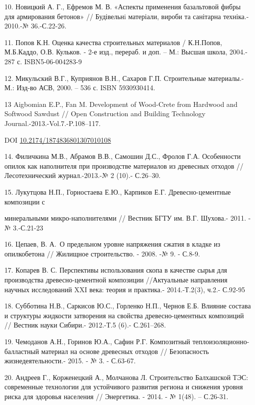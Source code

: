 10. Новицкий А. Г., Ефремов М. В. «Аспекты применения базальтовой фибры
для армирования бетонов» // Будівельнi матеріали, вироби та санітарна
техніка.- 2010.-№ 36.-С.22-26.
\href{http://www.irbis-nbuv.gov.ua/cgi-bin/irbis_nbuv/cgiirbis_64.exe?I21DBN=LINK&P21DBN=UJRN&Z21ID=&S21REF=10&S21CNR=20&S21STN=1&S21FMT=ASP_meta&C21COM=S&2_S21P03=FILA=&2_S21STR=bmvs_2010_36_5}{}

11. Попов К.Н. Оценка качества строительных материалов / К.Н.Попов,
М.Б.Каддо, О.В. Кульков. - 2-е изд., перераб. и доп. -- М.: Высшая
школа, 2004.- 287 с. ISBN5-06-004283-9

12. Микульский В.Г., Куприянов В.Н., Сахаров Г.П. Строительные
материалы.- М.: Изд-во АСВ, 2000. -- 536 с. ISBN 5930930414.

13 Aigbomian E.P., Fan M. Development of Wood-Crete from Hardwood and
Softwood Sawdust // Open Construction and Building Technology
Journal.-2013.-Vol.7.-P.108--117.

DOI
\href{http://dx.doi.org/10.2174/1874836801307010108}{10.2174/1874836801307010108}

14. Филичкина М.В., Абрамов В.В., Самошин Д.С., Фролов Г.А. Особенности
опилок как наполнителя при производстве материалов из древесных отходов
// Лесотехнический журнал.-2013.-№ 2 (10).- С.26--30.

15. Лукутцова Н.П., Горностаева Е.Ю., Карпиков Е.Г. Древесно-цементные
композиции с

минеральными микро-наполнителями // Вестник БГТУ им. В.Г. Шухова.-
2011. -№ 3.-С.21-23

16. Цепаев, В. А.~О предельном уровне напряжения сжатия в кладке из
опилкобетона // Жилищное строительство. - 2008. -№ 9. - С.8-9.

17. Копарев В. С. Перспективы использования скопа в качестве сырья для
производства древесно-цементной композиции //Актуальные направления
научных исследований XXI века: теория и практика.- 2014.-Т.2(3), ч.2.-
С.92-95

18. Субботина Н.В., Саркисов Ю.С., Горленко Н.П., Чернов Е.Б. Влияние
состава и структуры жидкости затворения на свойства древесно-цементных
композиций // Вестник науки Сибири.- 2012.-Т.5 (6).- С.261--268.

19. Чемоданов А.Н., Горинов Ю.А., Сафин Р.Г. Композитный
теплоизоляционно-балластный материал на основе древесных отходов //
Безопасность жизнедеятельности.- 2015. - № 3. - С.63-67.

20. Андреев Г., Корженецкий А., Молчанова Л. Строительство Балхашской
ТЭС: современные технологии для устойчивого развития региона и снижения
уровня риска для здоровья населения // Энергетика. - 2014. - № 1(48). --
С.26-31.

